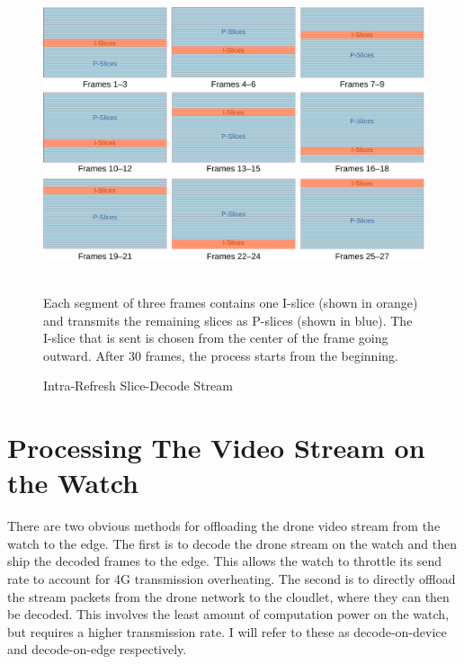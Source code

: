 \begin{figure}
    \centering
    \includegraphics[width=0.9\linewidth]{chapter3/FIGS/slice-encoding-crop.pdf}
    \begin{captext}
    \\[0.1cm] \small Each segment of three frames contains one I-slice (shown in orange) and transmits the remaining slices as P-slices (shown in blue). The I-slice that is sent is chosen from the center of the frame going outward. After 30 frames, the process starts from the beginning.
    \end{captext}
    \caption{Intra-Refresh Slice-Decode Stream}
    \label{fig:slice-encoding}
\end{figure}

\section{Processing The Video Stream on the Watch}
There are two obvious methods for offloading the drone video stream from the watch to the edge. The first is to decode the drone stream on the watch and then ship the decoded frames to the edge. This allows the watch to throttle its send rate to account for 4G transmission overheating. The second is to directly offload the stream packets from the drone network to the cloudlet, where they can then be decoded. This involves the least amount of computation power on the watch, but requires a higher transmission rate. I will refer to these as decode-on-device and decode-on-edge respectively.

